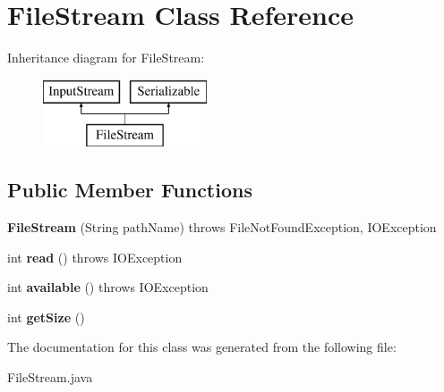 \hypertarget{class_file_stream}{}\section{File\+Stream Class Reference}
\label{class_file_stream}
Inheritance diagram for File\+Stream\+:\begin{figure}[H]
\begin{center}
\leavevmode
\includegraphics[height=2.000000cm]{class_file_stream}
\end{center}
\end{figure}
\subsection*{Public Member Functions}
\begin{DoxyCompactItemize}
\item 
\mbox{\label{class_file_stream_a120b1fd6e4c74e93199d063da1c65b98}} 
{\bfseries File\+Stream} (String path\+Name)  throws File\+Not\+Found\+Exception, I\+O\+Exception    
\item 
\mbox{\label{class_file_stream_a7f2ea40eff2241931a4ca971364cd532}} 
int {\bfseries read} ()  throws I\+O\+Exception 
\item 
\mbox{\label{class_file_stream_a7dd240b96afa9e37f9a6bd8e4b99e48b}} 
int {\bfseries available} ()  throws I\+O\+Exception     
\item 
\mbox{\label{class_file_stream_ab8f4d0c94a6c1357c7af77a4121e52fc}} 
int {\bfseries get\+Size} ()
\end{DoxyCompactItemize}


The documentation for this class was generated from the following file\+:\begin{DoxyCompactItemize}
\item 
File\+Stream.\+java\end{DoxyCompactItemize}
